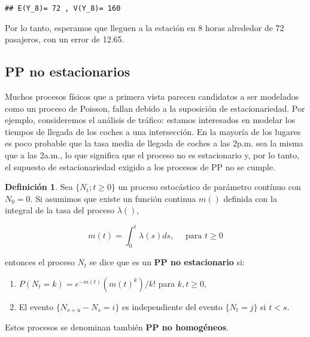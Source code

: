 \documentclass[
]{book}
\providecommand{\tightlist}{%
  \setlength{\itemsep}{0pt}\setlength{\parskip}{0pt}}
\newenvironment{yellowbox}{
  \definecolor{shadecolor}{rgb}{210, 180, 140}  
  \color{black}
  \begin{shaded}}
 {\end{shaded}}
\theoremstyle{definition}
\newtheorem{definition}{Definición}[chapter]
\theoremstyle{definition}
\theoremstyle{definition}
\theoremstyle{definition}
\theoremstyle{remark}
\begin{document}
\begin{verbatim}
## E(Y_8)= 72 , V(Y_8)= 160
\end{verbatim}

Por lo tanto, esperamos que lleguen a la estación en 8 horas alrededor de 72 pasajeros, con un error de 12.65.

\hypertarget{pp_noestacionarios}{%
\subsection{PP no estacionarios}\label{pp_noestacionarios}}

Muchos procesos físicos que a primera vista parecen candidatos a ser modelados como un proceso de Poisson, fallan debido a la suposición de estacionariedad. Por ejemplo, consideremos el análisis de tráfico: estamos interesados en modelar los tiempos de llegada de los coches a una intersección. En la mayoría de los lugares es poco probable que la tasa media de llegada de coches a las 2p.m. sea la misma que a las 2a.m., lo que significa que el proceso no es estacionario y, por lo tanto, el supuesto de estacionariedad exigido a los procesos de PP no se cumple.

\begin{yellowbox}

\begin{definition}
\protect\hypertarget{def:ppnohomogeneo}{}\label{def:ppnohomogeneo}Sea \(\{N_t; t \geq 0\}\) un proceso estocástico de parámetro contínuo con \(N_0 = 0\). Si asumimos que existe un función continua \(m()\) definida con la integral de la tasa del proceso \(\lambda()\),

\[m(t) = \int_0^t \lambda(s)ds, \quad \text{ para } t \geq 0\]

entonces el proceso \(N_t\) se dice que es un \textbf{PP no estacionario} si:

\begin{enumerate}
\def\labelenumi{\arabic{enumi}.}
\tightlist
\item
  \(P(N_t = k) = e^{-m(t)}(m(t)^k)/k!\) para \(k, t \geq 0\),
\item
  El evento \(\{N_{s+u} - N_s = i\}\) es independiente del evento \(\{N_t = j\}\) si \(t<s\).
\end{enumerate}

Estos procesos se denominan también \textbf{PP no homogéneos}.
\end{definition}

\end{yellowbox}
\end{document}
